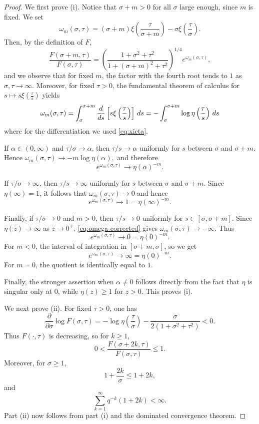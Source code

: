 \documentclass[10pt,a4paper]{amsart}
\def\int{\intop\nolimits}
\theoremstyle{plain}
\theoremstyle{remark}
\theoremstyle{definition}
\begin{document}
\begin{proof}
We first prove \rm(i). Notice that $\sigma +m>0$ for all $\sigma$ large enough, since $m$ is fixed. We set
\[
\omega_m(\sigma,\tau)
=
(\sigma+m)\xi\left(\frac{\tau}{\sigma+m}\right)
-
\sigma\xi\left(\frac{\tau}{\sigma}\right).
\] 
Then, by the definition of $F$,
\[
\frac{F(\sigma+m,\tau)}{F(\sigma,\tau)}
=
\left(
\frac{1+\sigma^2+\tau^2}
     {1+(\sigma+m)^2+\tau^2}
\right)^{1/4}
e^{\omega_m(\sigma,\tau)},
\]
and we observe that for fixed $m$, the factor with the fourth root tends to $1$ as
$\sigma,\tau\to\infty$. Moreover, for fixed $\tau>0$, the fundamental theorem of calculus for $s\mapsto s\xi\left(\frac{\tau}{s}\right)$ yields
\begin{equation}\label{eq:omega-corrected}
\omega_m(\sigma,\tau)
=\int_\sigma^{\sigma+m}
\frac{d}{ds}\left[ s\xi\left(\frac{\tau}{s}\right)\right]\,ds=
-\int_\sigma^{\sigma+m}
\log\eta\left(\frac{\tau}{s}\right)\,ds
\end{equation}
where for the differentiation we used \eqref{eq:xieta}.

If $\alpha\in(0,\infty)$ and $\tau/\sigma\to\alpha$, then
$\tau/s\to\alpha$ uniformly for
$s$ between $\sigma$ and $\sigma+m$. Hence $\omega_m(\sigma,\tau)
\to 
-m\log\eta(\alpha),$
and therefore
\[
e^{\omega_m(\sigma,\tau)}
\to 
\eta(\alpha)^{-m}.
\]

If $\tau/\sigma\to\infty$, then $\tau/s\to\infty$ uniformly for
$s$ between $\sigma$ and $\sigma+m$. Since $\eta(\infty)=1$, it follows that $
\omega_m(\sigma,\tau)\to 0$ 
and hence
\[
e^{\omega_m(\sigma,\tau)}
\to 1=\eta(\infty)^{-m}.
\]

Finally, if $\tau/\sigma\to0$ and $m> 0$, then $\tau/s\to0$ uniformly for
$s\in[\sigma, \sigma+m]$. Since $\eta(z)\to\infty$ as $z\to0^+$,
\eqref{eq:omega-corrected} gives
$\omega_m(\sigma,\tau)\to -\infty.$
Thus
\[
e^{\omega_m(\sigma,\tau)}
\to 0=\eta(0)^{-m}.
\]
For $m<0$, the interval of integration in $[\sigma+m, \sigma]$, so we get 
\[
e^{\omega_m(\sigma,\tau)}
\to \infty=\eta(0)^{-m}.
\]
For $m=0$, the quotient is identically equal to $1$.

Finally, the stronger assertion when $\alpha\neq 0$ follows directly from the fact that $\eta$ is singular only at $0$, while $\eta(z)\geq 1$ for $z>0$. This proves \rm(i).

We next prove \rm(ii). For fixed $\tau>0$, one has
\[
\frac{\partial}{\partial\sigma}\log F(\sigma,\tau)
=
-\log\eta\left(\frac{\tau}{\sigma}\right)
-\frac{\sigma}{2(1+\sigma^2+\tau^2)}
<0.
\]
Thus $F(\cdot,\tau)$ is decreasing, so for $k\geq 1$, 
\[
0<
\frac{F(\sigma+2k,\tau)}{F(\sigma,\tau)}
\leq1.
\]
Moreover, for $\sigma\geq1$,
\[
1+\frac{2k}{\sigma}\leq1+2k,
\]
and
\[
\sum_{k=1}^{\infty}q^{-k}(1+2k)<\infty.
\]
Part \rm(ii) now follows from part \rm(i) and the dominated convergence
theorem.


\end{proof}
\end{document}
